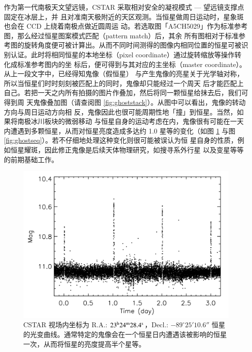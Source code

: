 作为第一代南极天文望远镜，CSTAR 采取相对安全的凝视模式 --- 望远镜支撑点固定在冰层上，并
且对准南天极附近的天区观测。当恒星做周日运动时，星象斑也会在 CCD 上绕着南极点做近圆周运
动。若选取图「A5CH5029」作为标准参考图，那么经过恒星图案模式匹配（pattern match）后，其余
所有图相对于标准参考图的旋转角度便可被计算出。从而不同时间测得的图像内相同位置的恒星可被识
别认证。此时将相同恒星的本地坐标（pixel coordinate）通过旋转缩放等操作转化成标准参考图内的坐
标后，便可得到与其对应的主坐标（master coordinate）。从上一段文字中，已经得知鬼像（假恒星）
与产生鬼像的亮星关于光学轴对称，所以当恒星们时时刻刻被匹配上的同时，鬼像却只能经过一个周天
后才能匹配上自己。若把一天之内所有拍摄的图片作叠加，然后将同一颗恒星给抹去后，我们可得到周
天鬼像叠加图（请查阅图 \ref{fig:ghoststack}）。从图中可以看出，鬼像的转动方向与周日运动方向相
反，鬼像因此也很可能周期性地「撞」到恒星。当然，如果将南极冰川板块的微弱移动\cite{ZhouX2013}
与恒星自身的运动考虑在内，鬼像很有可能在一天内遭遇到多颗恒星，从而对恒星亮度造成多达约 1.0 
星等的变化（如图 \ref{fig:lcwghost} 与图 \ref{fig:ghostseq}）。若不仔细地处理这种变化则很可能被误认为恒
星自身的性质，例如恒星耀斑\cite{Liang2016}，因此修正鬼像是后续天体物理研究，如搜寻系外行星
\cite{Wang2014CSTAR} 以及变星\cite{Yang2015}等等的前期基础工作。

\begin{figure}[t]
\centering
\includegraphics[width=1.0\textwidth, trim={0.0cm 0.5cm 0 0}]{figures/chapter2/f4_lcwghost.pdf}
\caption{CSTAR 视场内坐标为 R.A.: $23^\mathrm{h}24^\mathrm{m}28.4^\mathrm{s}$，Decl.: $-89^{\circ}25'10.6''$ 恒星的光变曲线。通常特定的鬼像会在一个恒星日内遭遇该被影响的恒星一次，从而将恒星的亮度提高半个星等。}
\label{fig:lcwghost}
\end{figure}

